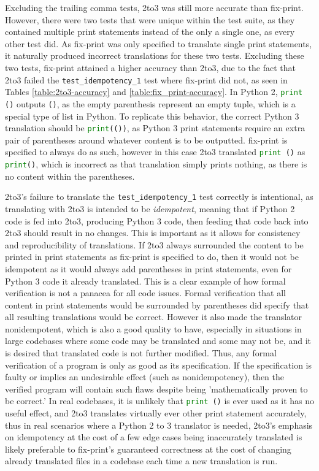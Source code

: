 Excluding the trailing comma tests, 2to3 was still more accurate than fix-print. However, there were two tests that were unique within the test suite, as they contained multiple print statements instead of the only a single one, as every other test did. As fix-print was only specified to translate single print statements, it naturally produced incorrect translations for these two tests. Excluding these two tests, fix-print attained a higher accuracy than 2to3, due to the fact that 2to3 failed the \verb|test_idempotency_1| test where fix-print did not, as seen in Tables \ref{table:2to3-accuracy} and \ref{table:fix_print-accuracy}. In Python 2, \lstinline[language=Python, style=pythonstyle]|print ()| outputs \verb|()|, as the empty parenthesis represent an empty tuple, which is a special type of list in Python. To replicate this behavior, the correct Python 3 translation should be \lstinline[language=Python, style=pythonstyle]|print(())|, as Python 3 print statements require an extra pair of parentheses around whatever content is to be outputted. fix-print is specified to always do as such, however in this case 2to3 translated \lstinline[language=Python, style=pythonstyle]|print ()| as \lstinline[language=Python, style=pythonstyle]|print()|, which is incorrect as that translation simply prints nothing, as there is no content within the parentheses.

2to3's failure to translate the \verb|test_idempotency_1| test correctly is intentional, as translating with 2to3 is intended to be \textit{idempotent}, meaning that if Python 2 code is fed into 2to3, producing Python 3 code, then feeding that code back into 2to3 should result in no changes. This is important as it allows for consistency and reproducibility of translations. If 2to3 always surrounded the content to be printed in print statements as fix-print is specified to do, then it would not be idempotent as it would always add parentheses in print statements, even for Python 3 code it already translated. This is a clear example of how formal verification is not a panacea for all code issues. Formal verification that all content in print statements would be surrounded by parentheses did specify that all resulting translations would be correct. However it also made the translator nonidempotent, which is also a good quality to have, especially in situations in large codebases where some code may be translated and some may not be, and it is desired that translated code is not further modified. Thus, any formal verification of a program is only as good as its specification. If the specification is faulty or implies an undesirable effect (such as nonidempotency), then the verified program will contain such flaws despite being 'mathematically proven to be correct.' In real codebases, it is unlikely that \lstinline[language=Python, style=pythonstyle]|print ()| is ever used as it has no useful effect, and 2to3 translates virtually ever other print statement accurately, thus in real scenarios where a Python 2 to 3 translator is needed, 2to3's emphasis on idempotency at the cost of a few edge cases being inaccurately translated is likely preferable to fix-print's guaranteed correctness at the cost of changing already translated files in a codebase each time a new translation is run.


